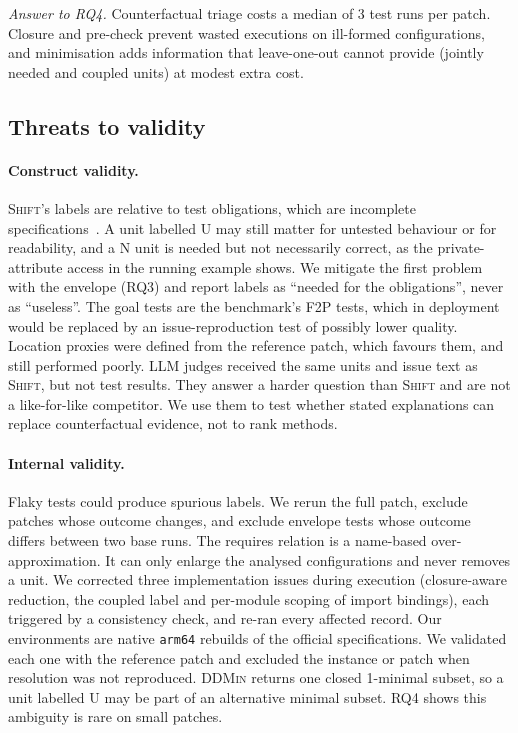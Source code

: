 \documentclass[a4paper,fleqn]{cas-sc}
\newcommand{\tool}{\textsc{Shift}}
\newcommand{\lab}[1]{\textsf{#1}}
\newcommand{\rqfourCallsMedian}{3}
\begin{document}
\emph{Answer to RQ4.} Counterfactual triage costs a median of \rqfourCallsMedian{} test runs per patch. Closure and pre-check prevent wasted executions on ill-formed configurations, and minimisation adds information that leave-one-out cannot provide (jointly needed and coupled units) at modest extra cost.


\subsection{Threats to validity}\label{sec:threats}

\paragraph{Construct validity.} \tool{}'s labels are relative to test obligations, which are incomplete specifications~\citep{barr2015oracle}. A unit labelled \lab{U} may still matter for untested behaviour or for readability, and a \lab{N} unit is needed but not necessarily correct, as the private-attribute access in the running example shows. We mitigate the first problem with the envelope (RQ3) and report labels as ``needed for the obligations'', never as ``useless''. The goal tests are the benchmark's F2P tests, which in deployment would be replaced by an issue-reproduction test of possibly lower quality. Location proxies were defined from the reference patch, which favours them, and still performed poorly. LLM judges received the same units and issue text as \tool{}, but not test results. They answer a harder question than \tool{} and are not a like-for-like competitor. We use them to test whether stated explanations can replace counterfactual evidence, not to rank methods.

\paragraph{Internal validity.} Flaky tests could produce spurious labels. We rerun the full patch, exclude patches whose outcome changes, and exclude envelope tests whose outcome differs between two base runs. The requires relation is a name-based over-approximation. It can only enlarge the analysed configurations and never removes a unit. We corrected three implementation issues during execution (closure-aware reduction, the coupled label and per-module scoping of import bindings), each triggered by a consistency check, and re-ran every affected record. Our environments are native \texttt{arm64} rebuilds of the official specifications. We validated each one with the reference patch and excluded the instance or patch when resolution was not reproduced. \textsc{DDMin} returns one closed 1-minimal subset, so a unit labelled \lab{U} may be part of an alternative minimal subset. RQ4 shows this ambiguity is rare on small patches.
\end{document}
